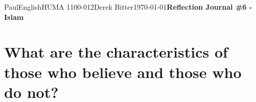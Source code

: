 \documentclass[12pt,letterpaper]{article}
\begin{document}
\begin{mla}{Paul}{English}{HUMA 1100-012}{Derek Bitter}{\today}{\textbf{Reflection Journal \#6 - Islam}}

\section{What are the characteristics of those who believe and those
  who do not?}



\end{mla}
\end{document}
